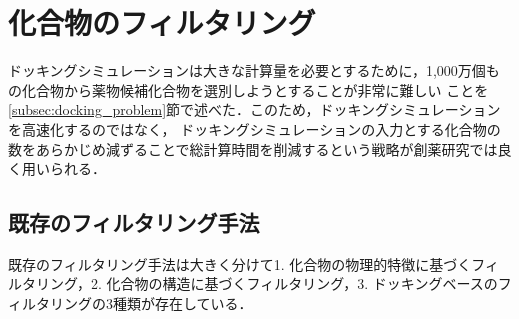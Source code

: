 \section{化合物のフィルタリング}
ドッキングシミュレーションは大きな計算量を必要とするために，1,000万個もの化合物から薬物候補化合物を選別しようとすることが非常に難しい
ことを\ref{subsec:docking_problem}節で述べた．このため，ドッキングシミュレーションを高速化するのではなく，
ドッキングシミュレーションの入力とする化合物の数をあらかじめ減ずることで総計算時間を削減するという戦略が創薬研究では良く用いられる．

\subsection{既存のフィルタリング手法}\label{subsec:existing_filtering}
既存のフィルタリング手法は大きく分けて1. 化合物の物理的特徴に基づくフィルタリング，2. 化合物の構造に基づくフィルタリング，3. ドッキングベースのフィルタリングの3種類が存在している．
